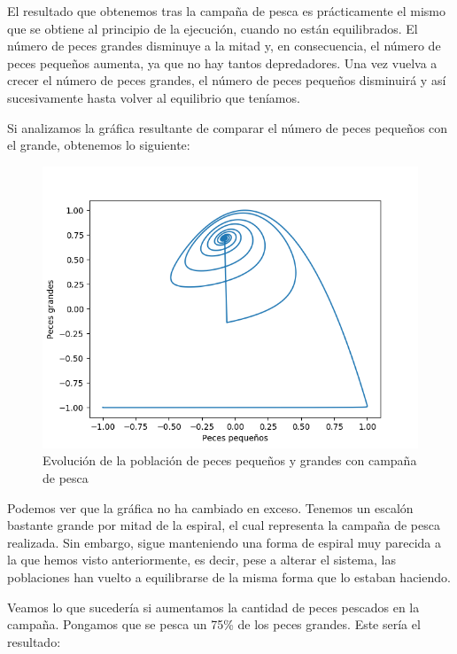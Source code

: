 \documentclass[11pt,a4paper]{report}
\begin{document}
El resultado que obtenemos tras la campaña de pesca es prácticamente el mismo que se obtiene al principio de la ejecución, cuando no están
equilibrados. El número de peces grandes disminuye a la mitad y, en consecuencia, el número de peces pequeños aumenta, ya que no hay tantos
depredadores. Una vez vuelva a crecer el número de peces grandes, el número de peces pequeños disminuirá y así sucesivamente hasta volver
al equilibrio que teníamos.

Si analizamos la gráfica resultante de comparar el número de peces pequeños con el grande, obtenemos lo siguiente:

\begin{figure}[H]
\centering
\includegraphics[scale=0.5]{img/ambos-4000-25-pesca.png}
\caption{Evolución de la población de peces pequeños y grandes con campaña de pesca}
\end{figure}

Podemos ver que la gráfica no ha cambiado en exceso. Tenemos un escalón bastante grande por mitad de la espiral, el cual representa la
campaña de pesca realizada. Sin embargo, sigue manteniendo una forma de espiral muy parecida a la que hemos visto anteriormente, es decir,
pese a alterar el sistema, las poblaciones han vuelto a equilibrarse de la misma forma que lo estaban haciendo.

Veamos lo que sucedería si aumentamos la cantidad de peces pescados en la campaña. Pongamos que se pesca un 75\% de los peces grandes. Este
sería el resultado:
\end{document}
